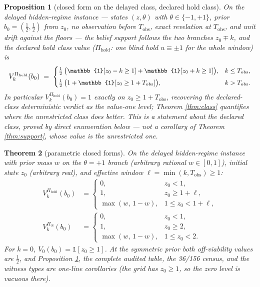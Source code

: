 \documentclass[10pt,twocolumn]{article}
\theoremstyle{plain}
\newtheorem{theorem}{Theorem}
\newtheorem{proposition}[theorem]{Proposition}
\theoremstyle{definition}
\theoremstyle{remark}
\begin{document}
\begin{proposition}[closed form on the delayed class, declared hold class]
\label{cor:closed}
On the delayed hidden-regime instance --- states \((z, \theta)\) with
\(\theta \in \{-1, +1\}\), prior \(b_{0} = (\tfrac{1}{2}, \tfrac{1}{2})\)
from \(z_{0}\), no observation before \(T_{\mathrm{obs}}\), exact
revelation at \(T_{\mathrm{obs}}\), and unit drift against the floors ---
the belief support follows the two branches \(z_{0} \mp k\), and the
\emph{declared hold class} value (\(\Pi_{\mathrm{hold}}\): one blind
hold \(u \equiv \pm 1\) for the whole window) is
\[
\small
V^{\Pi_{\mathrm{hold}}}_{k}(b_{0}) \;=\;
\begin{cases}
\tfrac{1}{2}\,\bigl(\mathbb{1}[z_{0} - k \ge 1] + \mathbb{1}[z_{0} + k \ge 1]\bigr), & k \le T_{\mathrm{obs}},\\[1ex]
\tfrac{1}{2}\,\bigl(1 + \mathbb{1}[z_{0} \ge 1 + T_{\mathrm{obs}}]\bigr), & k > T_{\mathrm{obs}}.
\end{cases}
\]
In particular \(V^{\Pi_{\mathrm{hold}}}_{k}(b_{0}) = 1\) exactly on
\(z_{0} \ge 1 + T_{\mathrm{obs}}\), recovering the declared-class
deterministic verdict as the value-one level; Theorem \ref{thm:class}
quantifies where the unrestricted class does better. This is a statement
about the declared class, proved by direct enumeration below --- not a
corollary of Theorem \ref{thm:support}, whose value is the unrestricted
one.
\end{proposition}

\begin{theorem}[parametric closed forms]\label{thm:parametric}
On the delayed hidden-regime instance with prior mass \(w\) on the
\(\theta = +1\) branch (arbitrary rational \(w \in [0,1]\)), initial
state \(z_{0}\) (arbitrary real), and effective window
\(\ell = \min(k, T_{\mathrm{obs}}) \ge 1\):
\begin{align*}
V^{\Pi_{\mathrm{hold}}}_{k}(b_{0}) &=
\begin{cases} 0, & z_{0} < 1,\\
1, & z_{0} \ge 1 + \ell,\\
\max(w,\, 1 - w), & 1 \le z_{0} < 1 + \ell,
\end{cases}
\\[0.4ex]
V^{\Pi_{\mathrm{ol}}}_{k}(b_{0}) &=
\begin{cases} 0, & z_{0} < 1,\\
1, & z_{0} \ge 2,\\
\max(w,\, 1 - w), & 1 \le z_{0} < 2.
\end{cases}
\end{align*}
For \(k = 0\), \(V_{0}(b_{0}) = \mathbb{1}[z_{0} \ge 1]\). At the
symmetric prior both off-viability values are \(\tfrac12\), and
Proposition \ref{cor:closed}, the complete audited table, the
36/156 census, and the witness types are one-line corollaries (the grid
has \(z_{0} \ge 1\), so the zero level is vacuous there).
\end{theorem}
\end{document}
